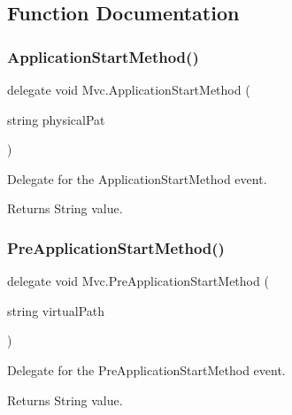 \subsection{Function Documentation}
\mbox{\label{namespace_mvc_ad1473305b15fdb8ed6ec3ad893e1c32f}} 
\subsubsection{\texorpdfstring{Application\+Start\+Method()}{ApplicationStartMethod()}}
{\footnotesize\ttfamily delegate void Mvc.\+Application\+Start\+Method (\begin{DoxyParamCaption}\item[{string}]{physical\+Pat }\end{DoxyParamCaption})}



Delegate for the Application\+Start\+Method event.

\begin{DoxyReturn}{Returns}
String value.
\end{DoxyReturn}
\mbox{\label{namespace_mvc_a3f7bbc102300a4bf8919106a8539057f}} 
\subsubsection{\texorpdfstring{Pre\+Application\+Start\+Method()}{PreApplicationStartMethod()}}
{\footnotesize\ttfamily delegate void Mvc.\+Pre\+Application\+Start\+Method (\begin{DoxyParamCaption}\item[{string}]{virtual\+Path }\end{DoxyParamCaption})}



Delegate for the Pre\+Application\+Start\+Method event.

\begin{DoxyReturn}{Returns}
String value.
\end{DoxyReturn}
